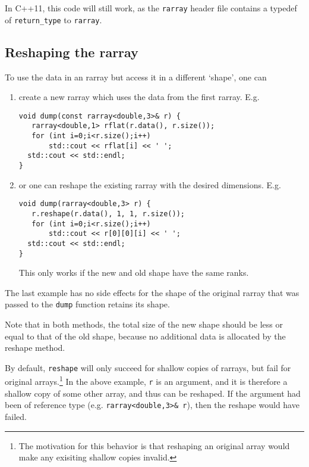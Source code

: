 \documentclass[11pt,twoside]{article}
\begin{document}
In C++11, this code will still work, as the \texttt{rarray} header file contains a typedef
of \texttt{return\_type} to \texttt{rarray}.

\subsection{Reshaping the rarray}

To use the data in an rarray but access it in a different `shape', one can
\begin{enumerate}
  \item create a new rarray which uses the data from the first rarray. E.g.
\vspace{-9pt}
\begin{framed}\vspace{-3pt}%
\begin{verbatim}
void dump(const rarray<double,3>& r) {
   rarray<double,1> rflat(r.data(), r.size());
   for (int i=0;i<r.size();i++)
       std::cout << rflat[i] << ' ';
  std::cout << std::endl;
}
\end{verbatim}%
\vspace{-12pt}
\end{framed}\vspace{-8pt}
\item or one can reshape the existing rarray with the desired dimensions. E.g.
\vspace{-2pt}
\begin{framed}\vspace{-4pt}%
\begin{verbatim}
void dump(rarray<double,3> r) {
   r.reshape(r.data(), 1, 1, r.size());
   for (int i=0;i<r.size();i++)
       std::cout << r[0][0][i] << ' ';
  std::cout << std::endl;
}
\end{verbatim}%
\vspace{-12pt}
\end{framed}\vspace{-8pt}
This only works if the new and old shape have the same ranks.
\end{enumerate}
The last example has no side effects for the shape of the original rarray that was passed to the \texttt{dump} function retains its shape. 

Note that in both methods, the total size of the new shape should be
less or equal to that of the old shape, because no additional data is
allocated by the reshape method.

By default, \texttt{reshape} will only succeed for shallow copies of
rarrays, but fail for original arrays.\footnote{The motivation for
  this behavior is that reshaping an original array would make any
  exisiting shallow copies invalid.}  In the above example, \texttt{r}
is an argument, and it is therefore a shallow copy of some other
array, and thus can be reshaped. If the argument had been of reference
type (e.g. \texttt{rarray<double,3>\& r}), then the reshape would have
failed.
\end{document}
